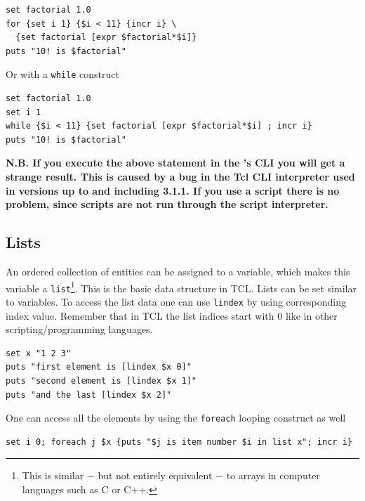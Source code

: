 \documentclass[
paper=a4,                       %
fontsize=11pt,                  %
twoside,                        %
footsepline,                    %
headsepline,                    %
headinclude=false,              %
footinclude=false,              %
pagesize,                       %
]{scrartcl}
\begin{document}
{\small\vspace{0,2cm}
\begin{lstlisting}[numbers=none]
set factorial 1.0
for {set i 1} {$i < 11} {incr i} \
  {set factorial [expr $factorial*$i]}
puts "10! is $factorial"
\end{lstlisting}\vspace{0,2cm}
}

\noindent Or with a  \lstinline|while| construct

{\small\vspace{0,2cm}
\begin{lstlisting}[numbers=none]
set factorial 1.0
set i 1
while {$i < 11} {set factorial [expr $factorial*$i] ; incr i}
puts "10! is $factorial"
\end{lstlisting}\vspace{0,2cm}
}

\noindent \textbf{N.B. If you execute the above statement in the \es{}'s CLI you will get a strange result. This is caused by a bug in the Tcl CLI interpreter used in \es{} versions up to and including 3.1.1. If you use a script there is no problem, since scripts are not run through the script interpreter.}
 
\subsection{Lists}
 
An ordered collection of entities can be assigned to a variable, which makes this variable a \lstinline|list|\footnote{This is similar $-$ but not entirely equivalent $-$ to arrays in computer languages such as C or C++.}. This is the basic data structure in TCL. Lists can be set similar to variables. To access the list data one can use \lstinline|lindex| by using corresponding index value. Remember that in TCL the list indices start with 0 like in other scripting/programming languages.
 
{\small\vspace{0,2cm}
\begin{lstlisting}[numbers=none]
set x "1 2 3"
puts "first element is [lindex $x 0]"
puts "second element is [lindex $x 1]"
puts "and the last [lindex $x 2]"
\end{lstlisting}\vspace{0,2cm}
}

\noindent One can access all the elements by using the \lstinline|foreach| looping construct as well

{\small\vspace{0,2cm}
\begin{lstlisting}[numbers=none]
set i 0; foreach j $x {puts "$j is item number $i in list x"; incr i}
\end{lstlisting}\vspace{0,2cm}
}
\end{document}
